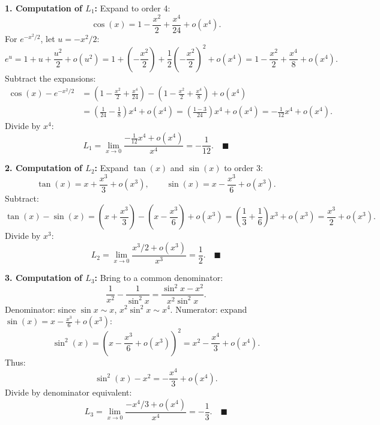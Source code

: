 \begin{tabletworkspace}[5.0cm]
\end{tabletworkspace}

\begin{solution}
\textbf{1. Computation of $L_1$:}
Expand to order 4:
\[
\cos(x) = 1 - \frac{x^2}{2} + \frac{x^4}{24} + o(x^4).
\]
For $e^{-x^2/2}$, let $u = -x^2/2$:
\[
e^u = 1 + u + \frac{u^2}{2} + o(u^2) = 1 + \left(-\frac{x^2}{2}\right) + \frac{1}{2}\left(-\frac{x^2}{2}\right)^2 + o(x^4) = 1 - \frac{x^2}{2} + \frac{x^4}{8} + o(x^4).
\]
Subtract the expansions:
\begin{align*}
\cos(x) - e^{-x^2/2} &= \left(1 - \frac{x^2}{2} + \frac{x^4}{24}\right) - \left(1 - \frac{x^2}{2} + \frac{x^4}{8}\right) + o(x^4) \\
&= \left(\frac{1}{24} - \frac{1}{8}\right)x^4 + o(x^4) = \left(\frac{1 - 3}{24}\right)x^4 + o(x^4) = -\frac{1}{12}x^4 + o(x^4).
\end{align*}
Divide by $x^4$:
\[
L_1 = \lim_{x \to 0} \frac{-\frac{1}{12}x^4 + o(x^4)}{x^4} = -\frac{1}{12}. \quad \blacksquare
\]

\textbf{2. Computation of $L_2$:}
Expand $\tan(x)$ and $\sin(x)$ to order 3:
\[
\tan(x) = x + \frac{x^3}{3} + o(x^3), \qquad \sin(x) = x - \frac{x^3}{6} + o(x^3).
\]
Subtract:
\[
\tan(x) - \sin(x) = \left(x + \frac{x^3}{3}\right) - \left(x - \frac{x^3}{6}\right) + o(x^3) = \left(\frac{1}{3} + \frac{1}{6}\right)x^3 + o(x^3) = \frac{x^3}{2} + o(x^3).
\]
Divide by $x^3$:
\[
L_2 = \lim_{x \to 0} \frac{x^3/2 + o(x^3)}{x^3} = \frac{1}{2}. \quad \blacksquare
\]

\textbf{3. Computation of $L_3$:}
Bring to a common denominator:
\[
\frac{1}{x^2} - \frac{1}{\sin^2 x} = \frac{\sin^2 x - x^2}{x^2 \sin^2 x}.
\]
Denominator: since $\sin x \sim x$, $x^2 \sin^2 x \sim x^4$.
Numerator: expand $\sin(x) = x - \frac{x^3}{6} + o(x^3)$:
\[
\sin^2(x) = \left(x - \frac{x^3}{6} + o(x^3)\right)^2 = x^2 - \frac{x^4}{3} + o(x^4).
\]
Thus:
\[
\sin^2(x) - x^2 = -\frac{x^4}{3} + o(x^4).
\]
Divide by denominator equivalent:
\[
L_3 = \lim_{x \to 0} \frac{-x^4/3 + o(x^4)}{x^4} = -\frac{1}{3}. \quad \blacksquare
\]
\end{solution}


